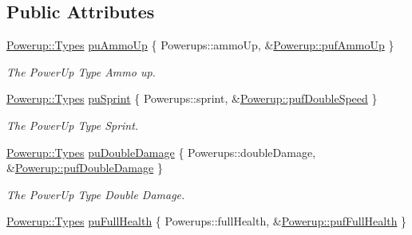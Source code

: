 \subsection*{Public Attributes}
\begin{DoxyCompactItemize}
\item 
\hypertarget{class_powerup_a15d145a4d703bbba47e0d6b5fef7400c}{\hyperlink{class_powerup_1_1_types}{Powerup\+::\+Types} \hyperlink{class_powerup_a15d145a4d703bbba47e0d6b5fef7400c}{pu\+Ammo\+Up} \{ Powerups\+::ammo\+Up, \&\hyperlink{class_powerup_aa5f2feab96d60c8a2d924ba7310f236c}{Powerup\+::puf\+Ammo\+Up} \}}\label{class_powerup_a15d145a4d703bbba47e0d6b5fef7400c}

\begin{DoxyCompactList}\small\item\em The Power\+Up Type Ammo up. \end{DoxyCompactList}\item 
\hypertarget{class_powerup_aeba52eeaf267195025040c3be62ee45f}{\hyperlink{class_powerup_1_1_types}{Powerup\+::\+Types} \hyperlink{class_powerup_aeba52eeaf267195025040c3be62ee45f}{pu\+Sprint} \{ Powerups\+::sprint, \&\hyperlink{class_powerup_ac009392b9c8baacde7677547fe599fb6}{Powerup\+::puf\+Double\+Speed} \}}\label{class_powerup_aeba52eeaf267195025040c3be62ee45f}

\begin{DoxyCompactList}\small\item\em The Power\+Up Type Sprint. \end{DoxyCompactList}\item 
\hypertarget{class_powerup_a52fd9b68996a23859c8860d099d43d67}{\hyperlink{class_powerup_1_1_types}{Powerup\+::\+Types} \hyperlink{class_powerup_a52fd9b68996a23859c8860d099d43d67}{pu\+Double\+Damage} \{ Powerups\+::double\+Damage, \&\hyperlink{class_powerup_a9e3e6d2edbd7ce8c873deedb22e1702f}{Powerup\+::puf\+Double\+Damage} \}}\label{class_powerup_a52fd9b68996a23859c8860d099d43d67}

\begin{DoxyCompactList}\small\item\em The Power\+Up Type Double Damage. \end{DoxyCompactList}\item 
\hypertarget{class_powerup_aa562b2b543c57e47a71be554f39791ae}{\hyperlink{class_powerup_1_1_types}{Powerup\+::\+Types} \hyperlink{class_powerup_aa562b2b543c57e47a71be554f39791ae}{pu\+Full\+Health} \{ Powerups\+::full\+Health, \&\hyperlink{class_powerup_af40ff299d75a5602af3694f3e96858b0}{Powerup\+::puf\+Full\+Health} \}}\label{class_powerup_aa562b2b543c57e47a71be554f39791ae}


\end{DoxyCompactItemize}
